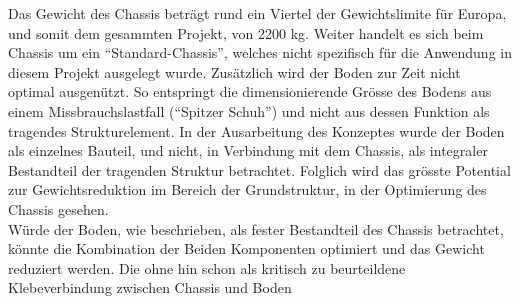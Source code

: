 Das Gewicht des Chassis beträgt rund ein Viertel der Gewichtslimite für Europa, und somit dem gesammten Projekt, von 2200 kg. Weiter handelt es sich beim Chassis um ein ``Standard-Chassis'', welches nicht spezifisch für die Anwendung in diesem Projekt ausgelegt wurde. Zusätzlich wird der Boden zur Zeit nicht optimal ausgenützt. So entspringt die dimensionierende Grösse des Bodens aus einem Missbrauchslastfall (``Spitzer Schuh'') und nicht aus dessen Funktion als tragendes Strukturelement. In der Ausarbeitung des Konzeptes wurde der Boden als einzelnes Bauteil, und nicht, in Verbindung mit dem Chassis, als integraler Bestandteil der tragenden Struktur betrachtet. Folglich wird das grösste Potential zur Gewichtsreduktion im Bereich der Grundstruktur, in der Optimierung des Chassis gesehen.\\
Würde der Boden, wie beschrieben, als fester Bestandteil des Chassis betrachtet, könnte die Kombination der Beiden Komponenten optimiert und das Gewicht reduziert werden. Die ohne hin schon als kritisch zu beurteildene Klebeverbindung zwischen Chassis und Boden

\newpage

